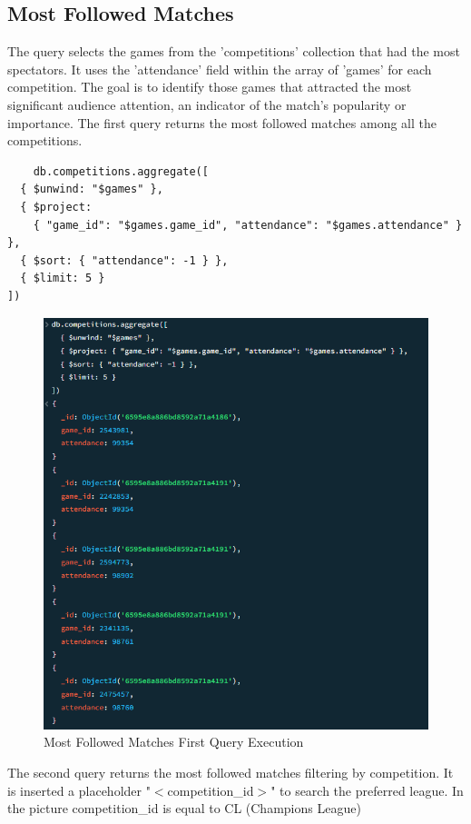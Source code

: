 \documentclass{Configuration_Files/PoliMi3i_thesis}
\begin{document}
\subsection{Most Followed Matches}
The query selects the games from the 'competitions' collection that had the most spectators. It uses the 'attendance' field within the array of 'games' for each competition. The goal is to identify those games that attracted the most significant audience attention, an indicator of the match's popularity or importance. 
The first query returns the most followed matches among all the competitions.
\begin{verbatim}
    db.competitions.aggregate([
  { $unwind: "$games" },
  { $project: 
    { "game_id": "$games.game_id", "attendance": "$games.attendance" } },
  { $sort: { "attendance": -1 } },
  { $limit: 5 }
])
\end{verbatim}
\begin{figure}[htbp]
    \centering
    \includegraphics[scale=1]{Images/Queries/Competitions/most_followed_games/mfg.png}
    \caption{Most Followed Matches First Query Execution}
\end{figure}
The second query returns the most followed matches filtering by competition. It is inserted a placeholder "$<$competition\_id$>$" to search the preferred league. In the picture competition\_id is equal to CL (Champions League)
\end{document}
